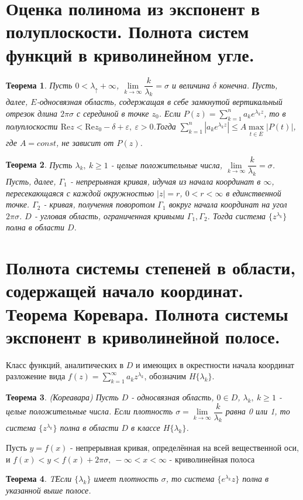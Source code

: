 \documentclass[9pt]{article}
\newtheorem{theorem}{Теорема} %
\begin{document}
		\section{Оценка полинома из экспонент в полуплоскости. Полнота систем функций в криволинейном угле.}
			\begin{theorem}
				Пусть $0 < \lambda_ \uparrow +\infty$, $\lim\limits_{k\to\infty} \dfrac{k}{\lambda_k} = \sigma$ и величина $\delta$ конечна. Пусть, далее, $E$-односвязная область, содержащая в себе замкнутой вертикальный отрезок длина $2\pi\sigma$ с серединой в точке $z_0$. Если $P(z) = \sum\limits_{k=1}^{n} a_k e^{\lambda_k z}$, то в полуплоскости $\mathrm{Re} z < \mathrm{Re} z_0 - \delta + \varepsilon, \ \varepsilon > 0$.Тогда $\sum\limits_{k=1}^{n} |a_ke^{\lambda_k z}| \leq A \max\limits_{t \in \overline{E}} |P(t)|$, где $A = const$, не зависит от $P(z)$.
			\end{theorem}
			\begin{theorem}
				Пусть $\lambda_k, \ k \geq 1$ - целые положительные числа, $\lim\limits_{k\to\infty} \dfrac{k}{\lambda_k} = \sigma$. Пусть, далее, $\Gamma_1$ - непрерывная кривая, идучая из начала координат в $\infty$, пересекающаяся с каждой окружностью $|z| = r$, $0 < r < \infty$ в единственной точке. $\Gamma_2$ - кривая, получення поворотом $\Gamma_1$ вокруг начала координат на угол $2\pi\sigma$. $D$ - угловая область, ограниченная кривыми $\Gamma_1, \Gamma_2$. Тогда система $\{z^{\lambda_k}\}$ полна в области $D$.		
			\end{theorem}
			
		\section{Полнота системы степеней в области, содержащей начало координат. Теорема Коревара.	Полнота системы экспонент в криволинейной полосе.}
			Класс функций, аналитических в $D$ и имеющих в окрестности начала координат разложение вида $f(z) = \sum\limits_{k=1}^{\infty} a_k z^{\lambda_k}$, обозначим $H\{\lambda_k\}$.
			\begin{theorem}(Кореавара)\newline
				Пусть $D$ - односвязная область, $0 \in D$, $\lambda_k , \ k \geq 1$ - целые положительные числа. Если плотность $\sigma = \lim\limits_{k\to\infty}\dfrac{k}{\lambda_k}$ равна 0 или 1, то система $\{z^{\lambda_k}\}$  полна в области $D$ в классе $H\{\lambda_k\}$.
			\end{theorem}
			Пусть $y = f(x)$ - непрерывная кривая, определённая на всей вещественной оси, и  $f(x) < y < f(x) + 2\pi\sigma, \ -\infty < x < \infty$ - криволинейная полоса
			\begin{theorem}
				TЕсли $\{\lambda_k\}$ имеет плотность $\sigma$, то система $\{e^{\lambda_k}z\}$ полна в указанной выше полосе.
			\end{theorem}
\end{document}
